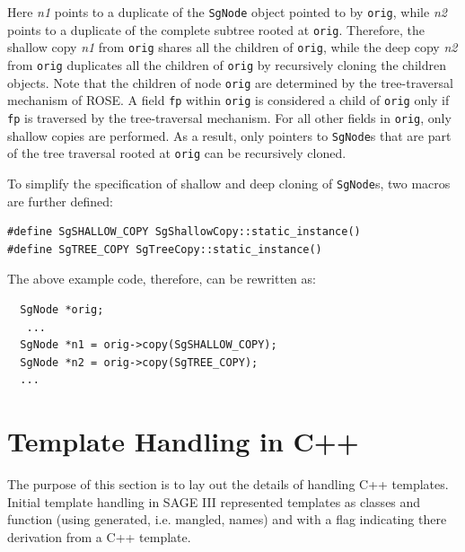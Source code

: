 Here {\it n1} points to a duplicate of the {\tt SgNode} object pointed to by {\tt orig},
while {\it n2} points to a duplicate of the complete subtree rooted at {\tt orig}.
Therefore, the shallow copy {\it n1} from {\tt orig} shares all the children 
of {\tt orig}, while the deep copy {\it n2} from {\tt orig} duplicates all the children 
of {\tt orig} by recursively cloning the children objects. 
Note that the children of node {\tt orig} are determined by the tree-traversal
mechanism of ROSE. A field {\tt fp} within {\tt orig} is considered a child of {\tt orig}
only if {\tt fp} is traversed by the tree-traversal mechanism. 
For all other fields in {\tt orig}, only shallow copies are performed. 
As a result, only pointers to {\tt SgNode}s that are part of
the tree traversal rooted at {\tt orig} can be recursively cloned. 
 
To simplify the specification of shallow and deep cloning
of {\tt SgNode}s, two macros are further defined:

{\indent
{\mySmallFontSize

\begin{verbatim}
#define SgSHALLOW_COPY SgShallowCopy::static_instance()
#define SgTREE_COPY SgTreeCopy::static_instance()
\end{verbatim}
}}

The above example code, therefore, can be rewritten as:

{\indent
{\mySmallFontSize

\begin{verbatim}
  SgNode *orig;
   ...
  SgNode *n1 = orig->copy(SgSHALLOW_COPY);
  SgNode *n2 = orig->copy(SgTREE_COPY);
  ...
\end{verbatim}
}}

\section{ Template Handling in C++}

   The purpose
of this section is to lay out the details of handling C++ templates.
Initial template handling in SAGE III represented templates as classes and function
(using generated, i.e. mangled, names) and with a flag indicating there derivation 
from a C++ template.

